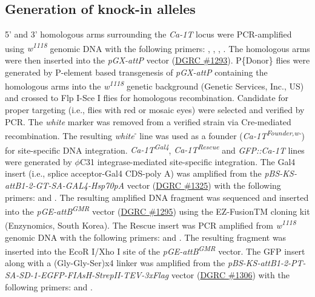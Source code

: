 \subsection*{Generation of knock-in alleles}

5' and 3' homologous arms surrounding the \emph{Ca-\alpha1T} locus were PCR-amplified using \emph{w\textsuperscript{1118}} genomic DNA with the following primers: , , , .
The homologous arms were then inserted into the \emph{pGX-attP} vector (\href{https://dgrc.bio.indiana.edu/product/View?product=1293}{DGRC \#1293}).
P\{Donor\} flies were generated by P-element based transgenesis of \emph{pGX-attP} containing the homologous arms into the \emph{w\textsuperscript{1118}} genetic background (Genetic Services, Inc., US) and crossed to Flp I-Sce I flies for homologous recombination.
Candidate for proper targeting (i.e., flies with red or mosaic eyes) were selected and verified by PCR.
The \emph{white} marker was removed from a verified strain via Cre-mediated recombination.
The resulting \emph{white}\textsuperscript{-} line was used as a founder (\emph{Ca-\alpha1T\textsuperscript{Founder,w-}}) for site-specific DNA integration.
\emph{Ca-\alpha1T\textsuperscript{Gal4}}, \emph{Ca-\alpha1T\textsuperscript{Rescue}} and \emph{GFP::Ca-\alpha1T} lines were generated by $\phi$C31 integrase-mediated site-specific integration. 
The Gal4 insert (i.e., splice acceptor-Gal4 CDS-poly A) was amplified from the \emph{pBS-KS-attB1-2-GT-SA-GAL4-Hsp70pA} vector (\href{https://dgrc.bio.indiana.edu/product/View?product=1325}{DGRC \#1325}) with the following primers:  and . 
The resulting amplified DNA fragment was sequenced and inserted into the \emph{pGE-attB\textsuperscript{GMR}} vector (\href{https://dgrc.bio.indiana.edu/product/View?product=1295}{DGRC \#1295}) using the EZ-FusionTM cloning kit (Enzynomics, South Korea). 
The Rescue insert was PCR amplified from \emph{w\textsuperscript{1118}} genomic DNA with the following primers:  and .
The resulting fragment was inserted into the EcoR I/Xho I site of the \emph{pGE-attB\textsuperscript{GMR}} vector. 
The GFP insert along with a (Gly-Gly-Ser)x4 linker was amplified from the \emph{pBS-KS-attB1-2-PT-SA-SD-1-EGFP-FIAsH-StrepII-TEV-3xFlag} vector (\href{https://dgrc.bio.indiana.edu/product/View?product=1306}{DGRC \#1306}) with the following primers:  and .
